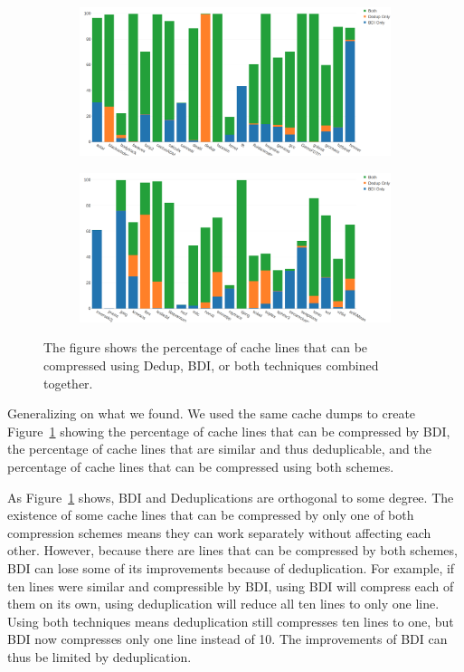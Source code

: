 \begin{figure}
    \begin{subfigure}[t]{\textwidth}
        \includegraphics[width=\textwidth]{CompPotential1.png}
    \end{subfigure}
    \begin{subfigure}[b]{\textwidth}
        \includegraphics[width=\textwidth]{CompPotential2.png}
    \end{subfigure}
    \caption[Compressible lines]{The figure shows the percentage of cache lines that can be compressed using Dedup, BDI, or both techniques combined together.}
    \label{fig:CompPossibility}
\end{figure}
Generalizing on what we found. We used the same cache dumps to create Figure~\ref{fig:CompPossibility} showing the percentage of cache lines that can be compressed by BDI, the percentage of cache lines that are similar and thus deduplicable, and the percentage of cache lines that can be compressed using both schemes.\par
As Figure~\ref{fig:CompPossibility} shows, BDI and Deduplications are orthogonal to some degree. The existence of some cache lines that can be compressed by only one of both compression schemes means they can work separately without affecting each other. However, because there are lines that can be compressed by both schemes, BDI can lose some of its improvements because of deduplication. For example, if ten lines were similar and compressible by BDI, using BDI will compress each of them on its own, using deduplication will reduce all ten lines to only one line. Using both techniques means deduplication still compresses ten lines to one, but BDI now compresses only one line instead of 10. The improvements of BDI can thus be limited by deduplication.\par
